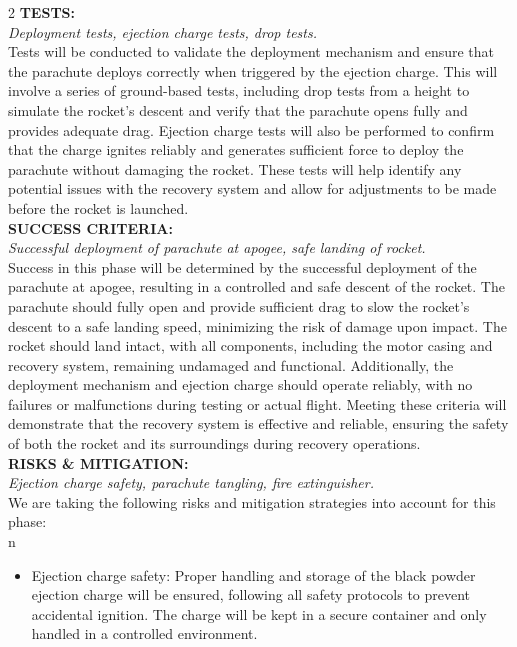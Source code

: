 \documentclass[10pt]{report}
\begin{document}
\begin{multicols}{2}
  \noindent \textbf{\large TESTS:}\\  \textit{Deployment tests, ejection charge tests, drop tests.} \\
  Tests will be conducted to validate the deployment mechanism and ensure that the parachute deploys correctly when triggered by the ejection charge. This will involve a series of ground-based tests, including drop tests from a height to simulate the rocket's descent and verify that the parachute opens fully and provides adequate drag. Ejection charge tests will also be performed to confirm that the charge ignites reliably and generates sufficient force to deploy the parachute without damaging the rocket. These tests will help identify any potential issues with the recovery system and allow for adjustments to be made before the rocket is launched. \\

  \noindent \textbf{\large SUCCESS CRITERIA:}\\  \textit{Successful deployment of parachute at apogee, safe landing of rocket.} \\
  Success in this phase will be determined by the successful deployment of the parachute at apogee, resulting in a controlled and safe descent of the rocket. The parachute should fully open and provide sufficient drag to slow the rocket's descent to a safe landing speed, minimizing the risk of damage upon impact. The rocket should land intact, with all components, including the motor casing and recovery system, remaining undamaged and functional. Additionally, the deployment mechanism and ejection charge should operate reliably, with no failures or malfunctions during testing or actual flight. Meeting these criteria will demonstrate that the recovery system is effective and reliable, ensuring the safety of both the rocket and its surroundings during recovery operations. \\

  \noindent \textbf{\large RISKS \& MITIGATION:}\\  \textit{Ejection charge safety, parachute tangling, fire extinguisher.} \\
  We are taking the following risks and mitigation strategies into account for this phase: \\
n  \begin{itemize}
    \item Ejection charge safety: Proper handling and storage of the black powder ejection charge will be ensured, following all safety protocols to prevent accidental ignition. The charge will be kept in a secure container and only handled in a controlled environment. \\ 


\end{itemize}
\end{multicols}
\end{document}
